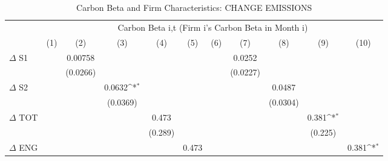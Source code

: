 \begin{table}[htbp]\centering
\def\sym#1{\ifmmode^{#1}\else\(^{#1}\)\fi}
\caption{Carbon Beta and Firm Characteristics: CHANGE EMISSIONS}
\begin{tabular}{l*{10}{c}}
\hline\hline
                &\multicolumn{10}{c}{Carbon Beta i,t (Firm i's Carbon Beta in Month i)}                                                                                                                       \\\cmidrule(lr){2-11}
                &\multicolumn{1}{c}{(1)}         &\multicolumn{1}{c}{(2)}         &\multicolumn{1}{c}{(3)}         &\multicolumn{1}{c}{(4)}         &\multicolumn{1}{c}{(5)}         &\multicolumn{1}{c}{(6)}         &\multicolumn{1}{c}{(7)}         &\multicolumn{1}{c}{(8)}         &\multicolumn{1}{c}{(9)}         &\multicolumn{1}{c}{(10)}         \\
\hline
$\Delta$ S1     &                  &  0.00758         &                  &                  &                  &                  &   0.0252         &                  &                  &                  \\
                &                  & (0.0266)         &                  &                  &                  &                  & (0.0227)         &                  &                  &                  \\
$\Delta$ S2     &                  &                  &   0.0632\sym{*}  &                  &                  &                  &                  &   0.0487         &                  &                  \\
                &                  &                  & (0.0369)         &                  &                  &                  &                  & (0.0304)         &                  &                  \\
$\Delta$ TOT    &                  &                  &                  &    0.473         &                  &                  &                  &                  &    0.381\sym{*}  &                  \\
                &                  &                  &                  &  (0.289)         &                  &                  &                  &                  &  (0.225)         &                  \\
$\Delta$ ENG    &                  &                  &                  &                  &    0.473         &                  &                  &                  &                  &    0.381\sym{*}  \\

\end{tabular}
\end{table}
